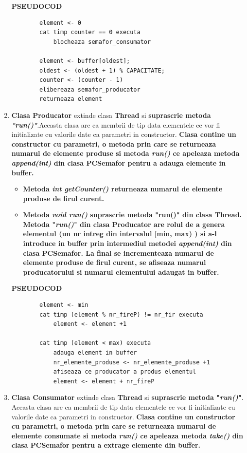 \documentclass[14pt]{article}
\begin{document}
\begin{enumerate}
 \textbf{PSEUDOCOD}
 \begin{lstlisting}
	    element <- 0
		cat timp counter == 0 executa
			blocheaza semafor_consumator	

		element <- buffer[oldest];
		oldest <- (oldest + 1) % CAPACITATE;
		counter <- (counter - 1)
		elibereaza semafor_producator
		returneaza element
\end{lstlisting}

\newpage

\item \textbf{Clasa Producator} extinde clasa \textbf{Thread} si \textbf{suprascrie metoda \textit{"run()"}}.Aceasta clasa are ca membrii de tip data elementele ce vor fi  initializate cu valorile date ca parametri in constructor. \textbf{Clasa contine un constructor cu parametri, o metoda prin care se returneaza numarul de elemente produse si metoda\textit{ run() }ce apeleaza metoda \textit{append(int)} din clasa PCSemafor pentru a adauga elemente in buffer.}



\begin{itemize}
\item \textbf{Metoda\textit{ int getCounter()} returneaza numarul de elemente produse de firul curent.}
\end{itemize}


\begin{itemize}
\item \textbf{Metoda \textit{void run()} suprascrie metoda "run()" din clasa Thread. Metoda "\textit{run()}" din clasa Producator are rolul de a genera elementul (un nr intreg din intervalul [min, max) ) si a-l introduce in buffer prin intermediul metodei\textit{ append(int)} din clasa PCSemafor. La final se incrementeaza numarul de elemente produse de firul curent, se afiseaza numarul producatorului si numarul elementului adaugat in buffer.}
\end{itemize}


 \textbf{PSEUDOCOD}
 \begin{lstlisting}
	    element <- min
		cat timp (element % nr_fireP) != nr_fir executa
			element <- element +1
		
		cat timp (element < max) executa
			adauga element in buffer
			nr_elemente_produse <- nr_elemente_produse +1
			afiseaza ce producator a produs elementul
			element <- element + nr_fireP
\end{lstlisting}

\item \textbf{Clasa Consumator} extinde clasa \textbf{Thread} si \textbf{suprascrie metoda "\textit{run()}"}. Aceasta clasa are ca membrii de tip data elementele ce vor fi  initializate cu valorile date ca parametri in constructor. \textbf{Clasa contine un constructor cu parametri, o metoda prin care se returneaza numarul de elemente consumate si metoda\textit{ run()} ce apeleaza metoda\textit{ take()} din clasa PCSemafor pentru a extrage elemente din buffer.}



\end{enumerate}
\end{document}
